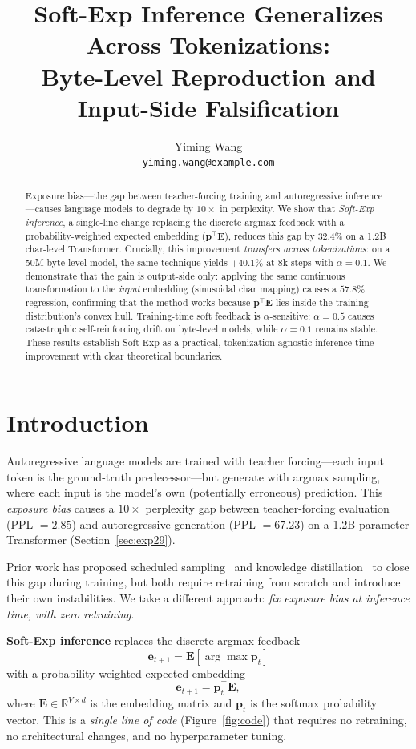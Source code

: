 \documentclass[11pt]{article}
\title{Soft-Exp Inference Generalizes Across Tokenizations: \\ Byte-Level Reproduction and Input-Side Falsification}
\author{
  Yiming Wang \\
  \texttt{yiming.wang@example.com}
}
\begin{document}
\maketitle

\begin{abstract}
Exposure bias—the gap between teacher-forcing training and autoregressive inference—causes language models to degrade by $10\times$ in perplexity. We show that \emph{Soft-Exp inference}, a single-line change replacing the discrete argmax feedback with a probability-weighted expected embedding ($\mathbf{p}^\top \mathbf{E}$), reduces this gap by $32.4\%$ on a 1.2B char-level Transformer. Crucially, this improvement \emph{transfers across tokenizations}: on a 50M byte-level model, the same technique yields $+40.1\%$ at 8k steps with $\alpha=0.1$. We demonstrate that the gain is output-side only: applying the same continuous transformation to the \emph{input} embedding (sinusoidal char mapping) causes a $57.8\%$ regression, confirming that the method works because $\mathbf{p}^\top \mathbf{E}$ lies inside the training distribution's convex hull. Training-time soft feedback is $\alpha$-sensitive: $\alpha=0.5$ causes catastrophic self-reinforcing drift on byte-level models, while $\alpha=0.1$ remains stable. These results establish Soft-Exp as a practical, tokenization-agnostic inference-time improvement with clear theoretical boundaries.
\end{abstract}

\section{Introduction}

Autoregressive language models are trained with teacher forcing—each input token is the ground-truth predecessor—but generate with argmax sampling, where each input is the model's own (potentially erroneous) prediction. This \emph{exposure bias} causes a $10\times$ perplexity gap between teacher-forcing evaluation (PPL $= 2.85$) and autoregressive generation (PPL $= 67.23$) on a 1.2B-parameter Transformer (Section~\ref{sec:exp29}).

Prior work has proposed scheduled sampling~\cite{bengio2015scheduled} and knowledge distillation~\cite{hinton2015distillation} to close this gap during training, but both require retraining from scratch and introduce their own instabilities. We take a different approach: \emph{fix exposure bias at inference time, with zero retraining}.

\textbf{Soft-Exp inference} replaces the discrete argmax feedback
\[
\mathbf{e}_{t+1} = \mathbf{E}[\arg\max \mathbf{p}_t]
\]
with a probability-weighted expected embedding
\[
\mathbf{e}_{t+1} = \mathbf{p}_t^\top \mathbf{E},
\]
where $\mathbf{E} \in \mathbb{R}^{V \times d}$ is the embedding matrix and $\mathbf{p}_t$ is the softmax probability vector. This is a \emph{single line of code} (Figure~\ref{fig:code}) that requires no retraining, no architectural changes, and no hyperparameter tuning.
\end{document}
